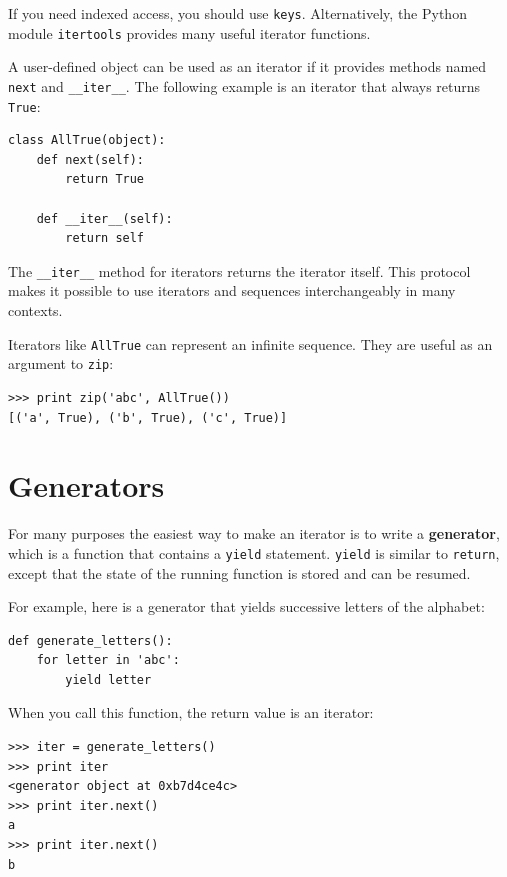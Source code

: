 \documentclass[10pt]{book}
\begin{document}
If you need indexed access, you should use {\tt keys}.
Alternatively, the Python module {\tt itertools} provides
many useful iterator functions.

A user-defined object can be used as an iterator if it
provides methods named {\tt next} and \verb"__iter__".
The following example is an iterator that always returns {\tt True}:

\begin{verbatim}
class AllTrue(object):
    def next(self):
        return True

    def __iter__(self):
        return self
\end{verbatim}

The \verb"__iter__" method for iterators returns the iterator
itself.  This protocol makes it possible to use iterators
and sequences interchangeably in many contexts.

Iterators like {\tt AllTrue} can represent an infinite sequence.
They are useful as an argument to {\tt zip}:

\begin{verbatim}
>>> print zip('abc', AllTrue())
[('a', True), ('b', True), ('c', True)]
\end{verbatim}


\section{Generators}

For many purposes the easiest way to make an iterator is to
write a {\bf generator}, which is a function that contains a
{\tt yield} statement.  {\tt yield} is similar to {\tt return},
except that the state of the running function is stored and
can be resumed.

For example, here is a generator that yields successive letters
of the alphabet:

\begin{verbatim}
def generate_letters():
    for letter in 'abc':
        yield letter
\end{verbatim}

When you call this function, the return value is an iterator:

\begin{verbatim}
>>> iter = generate_letters()
>>> print iter
<generator object at 0xb7d4ce4c>
>>> print iter.next()
a
>>> print iter.next()
b
\end{verbatim}
\end{document}
